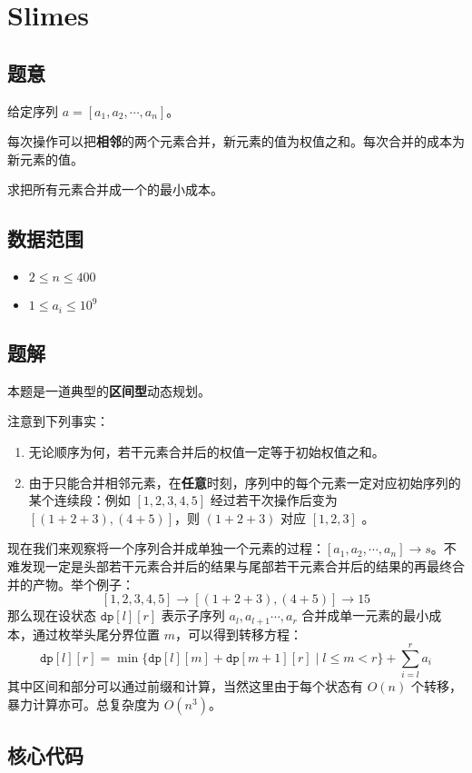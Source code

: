 \section{Slimes}
\subsection*{题意}
给定序列 $a = [a_1 ,a_2 ,\cdots, a_n]$。

每次操作可以把\textbf{相邻}的两个元素合并，新元素的值为权值之和。每次合并的成本为新元素的值。

求把所有元素合并成一个的最小成本。

\subsection*{数据范围}
\begin{itemize}
\item $2 \leq n \leq 400$
\item $1 \leq a_i \leq 10^9$
\end{itemize}

\subsection*{题解}

本题是一道典型的\textbf{区间型}动态规划。

注意到下列事实：
\begin{enumerate}
\item 无论顺序为何，若干元素合并后的权值一定等于初始权值之和。
\item 由于只能合并相邻元素，在\textbf{任意}时刻，序列中的每个元素一定对应初始序列的某个连续段：例如 $[1,2,3,4,5]$ 经过若干次操作后变为 $[(1+2+3),(4+5)]$，则 $(1+2+3)$ 对应 $[1,2,3]$ 。

\end{enumerate}
现在我们来观察将一个序列合并成单独一个元素的过程：$[a_1 ,a_2 ,\cdots, a_n] \rightarrow s$。不难发现一定是头部若干元素合并后的结果与尾部若干元素合并后的结果的再最终合并的产物。举个例子：
$$
[1,2,3,4,5] \rightarrow [(1+2+3),(4+5)] \rightarrow 15
$$那么现在设状态 ${\texttt{dp}[l][r]}$ 表示子序列 $a_l,a_{l+1}\cdots, a_r$ 合并成单一元素的最小成本，通过枚举头尾分界位置 $m$，可以得到转移方程：
$$
{\texttt{dp}[l][r]} = \min\{{\texttt{dp}[l][m]}+{\texttt{dp}[m+1][r]}\mid l\le m< r\} + \sum_{i = l}^r a_i
$$
其中区间和部分可以通过前缀和计算，当然这里由于每个状态有 $O(n)$ 个转移，暴力计算亦可。总复杂度为 $O(n^3)$。 





\newpage
\subsection*{核心代码}
\inputminted[linenos,autogobble]{cpp}{./Code/N.cpp}
\newpage